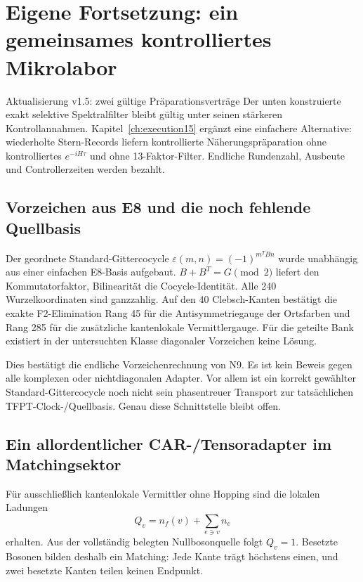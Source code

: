 \chapter{Eigene Fortsetzung: ein gemeinsames kontrolliertes Mikrolabor}
\label{ch:micro14}
\begin{bild}{Aktualisierung v1.5: zwei gültige Präparationsverträge}
Der unten konstruierte exakt selektive Spektralfilter bleibt gültig unter seinen stärkeren Kontrollannahmen. Kapitel~\ref{ch:execution15} ergänzt eine einfachere Alternative: wiederholte Stern-Records liefern kontrollierte Näherungspräparation ohne kontrolliertes $e^{-iH\tau}$ und ohne 13-Faktor-Filter. Endliche Rundenzahl, Ausbeute und Controllerzeiten werden bezahlt.
\end{bild}
\section{Vorzeichen aus E8 und die noch fehlende Quellbasis}
Der geordnete Standard-Gittercocycle $\varepsilon(m,n)=(-1)^{m^TBn}$ wurde unabhängig aus einer einfachen E8-Basis aufgebaut. $B+B^T=G\pmod2$ liefert den Kommutatorfaktor, Bilinearität die Cocycle-Identität. Alle 240 Wurzelkoordinaten sind ganzzahlig. Auf den 40 Clebsch-Kanten bestätigt die exakte F2-Elimination Rang 45 für die Antisymmetriegauge der Ortsfarben und Rang 285 für die zusätzliche kantenlokale Vermittlergauge. Für die geteilte Bank existiert in der untersuchten Klasse diagonaler Vorzeichen keine Lösung.

Dies bestätigt die endliche Vorzeichenrechnung von N9. Es ist kein Beweis gegen alle komplexen oder nichtdiagonalen Adapter. Vor allem ist ein korrekt gewählter Standard-Gittercocycle noch nicht sein phasentreuer Transport zur tatsächlichen TFPT-Clock-/Quellbasis. Genau diese Schnittstelle bleibt offen.

\section{Ein allordentlicher CAR-/Tensoradapter im Matchingsektor}
Für ausschließlich kantenlokale Vermittler ohne Hopping sind die lokalen Ladungen
\begin{equation}
Q_v=n_f(v)+\sum_{e\ni v}n_e
\end{equation}
erhalten. Aus der vollständig belegten Nullbosonquelle folgt $Q_v=1$. Besetzte Bosonen bilden deshalb ein Matching: Jede Kante trägt höchstens einen, und zwei besetzte Kanten teilen keinen Endpunkt.

